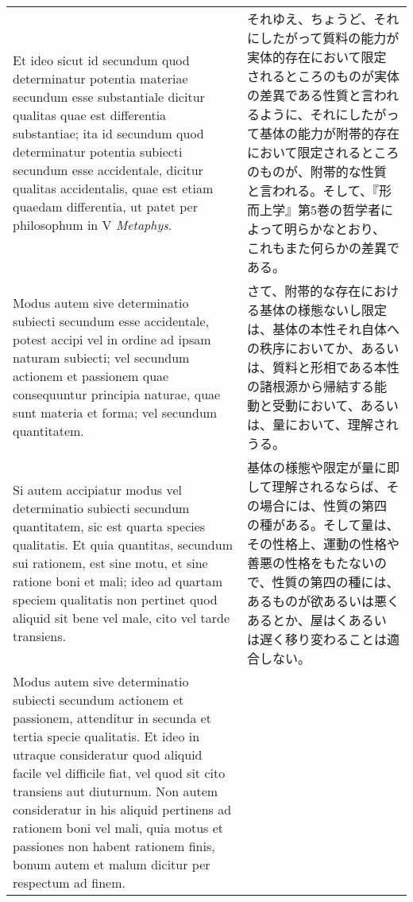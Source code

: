 \documentclass[10pt]{jsarticle} %
\begin{document}
\begin{longtable}{p{21em}p{21em}}
\\


Et ideo
sicut id secundum quod determinatur potentia materiae secundum esse
substantiale dicitur qualitas quae est differentia substantiae; ita id
secundum quod determinatur potentia subiecti secundum esse
accidentale, dicitur qualitas accidentalis, quae est etiam quaedam
differentia, ut patet per philosophum in V {\itshape Metaphys}. 


&

それゆえ、ちょうど、それにしたがって質料の能力が実体的存在において限定
されるところのものが実体の差異である性質と言われるように、それにしたがっ
て基体の能力が附帯的存在において限定されるところのものが、附帯的な性質
と言われる。そして、『形而上学』第5巻の哲学者によって明らかなとおり、
これもまた何らかの差異である。


\\



Modus autem sive
determinatio subiecti secundum esse accidentale, potest accipi vel in
ordine ad ipsam naturam subiecti; vel secundum actionem et passionem
quae consequuntur principia naturae, quae sunt materia et forma; vel
secundum quantitatem. 


&

さて、附帯的な存在における基体の様態ないし限定は、基体の本性それ自体へ
の秩序においてか、あるいは、質料と形相である本性の諸根源から帰結する能
動と受動において、あるいは、量において、理解されうる。


\\



Si autem accipiatur modus vel determinatio
subiecti secundum quantitatem, sic est quarta species qualitatis. Et
quia quantitas, secundum sui rationem, est sine motu, et sine ratione
boni et mali; ideo ad quartam speciem qualitatis non pertinet quod
aliquid sit bene vel male, cito vel tarde transiens. 



&


基体の様態や限定が量に即して理解されるならば、その場合には、性質の第四
の種がある。そして量は、その性格上、運動の性格や善悪の性格をもたないの
で、性質の第四の種には、あるものが欲あるいは悪くあるとか、屋はくあるい
は遅く移り変わることは適合しない。


\\


Modus autem sive
determinatio subiecti secundum actionem et passionem, attenditur in
secunda et tertia specie qualitatis. Et ideo in utraque consideratur
quod aliquid facile vel difficile fiat, vel quod sit cito transiens
aut diuturnum. Non autem consideratur in his aliquid pertinens ad
rationem boni vel mali, quia motus et passiones non habent rationem
finis, bonum autem et malum dicitur per respectum ad finem. 



\end{longtable}
\end{document}
